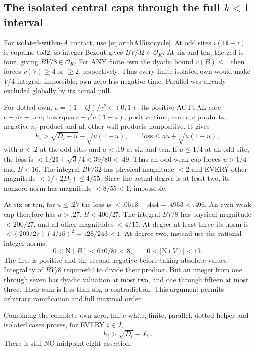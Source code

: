 \documentclass[11pt]{article}
\begin{document}
\subsection{The isolated central caps through the full \(h<1\) interval}
\label{app:arithA15centralisolated}

For isolated-within-\(A\) contact, use
\eqref{eq:arithA15isocycle}.
At odd sites \(i(16-i)\) is coprime to32, so integer Bezout
gives \(BV/32\in\mathcal O_K\).
At six and ten, the gcd is four, giving \(BV/8\in\mathcal O_K\).
For ANY finite own the dyadic bound \(v(B)\le1\) then forces
\(v(V)\ge4\) or \(\ge2\), respectively.
Thus every finite isolated own would make \(V/4\) integral,
impossible; own zero has negative time.
Parallel was already excluded globally by its actual null.

For dotted own, \(u=(1-Q)/\gamma^2\in(0,1)\).
Its positive ACTUAL core
\(c+\beta e+\gamma u n_i\)
has square \(-\gamma^2u(1-u)\), positive time, zero \(c,e\)
products, negative \(n_i\) product and all other wall products
nonpositive.
It gives
\[
 h_i>\sqrt{D_i-u}-\sqrt{u(1-u)},\qquad
 \text{loss}\le au+\sqrt{u(1-u)} ,
\]
with \(a<.2\) at the odd sites and \(a<.19\) at six and ten.
If \(u\le1/4\) at an odd site, the loss is
\(<1/20+\sqrt3/4<39/80<.49\).
Thus an odd weak cap forces \(u>1/4\) and \(B<16\).
The integral \(BV/32\) has physical magnitude \(<2\) and
EVERY other magnitude \(<1/(2D_i)\le4/55\).
Since the actual degree is at least two, its nonzero norm has
magnitude \(<8/55<1\), impossible.

At six or ten, for \(u\le.27\) the loss is
\(<.0513+.444=.4953<.496\).
An even weak cap therefore has \(u>.27\), \(B<400/27\).
The integral \(BV/8\) has physical magnitude \(<200/27\),
and all other magnitudes \(<4/15\).
At degree at least three its norm is
\(<(200/27)(4/15)^2=128/243<1\).
At degree two, instead use the rational integer norms:
\[
       0<\mathrm N(B)<640/81<8,\qquad
       0<|\mathrm N(V)|<16 .
\]
The first is positive and the second negative before taking
absolute values.
Integrality of \(BV/8\) requires64 to divide their product.
But an integer from one through seven has dyadic valuation
at most two, and one through fifteen at most three.
Their sum is less than six, a contradiction.
This argument permits arbitrary ramification and full maximal order.

Combining the complete own-zero, finite-white, finite, parallel,
dotted-helper and isolated cases proves, for EVERY \(i\in J\),
\[
                            h_i>\sqrt{D_i}-\ell_i .
\]
There is still NO midpoint-eight assertion.
\end{document}
